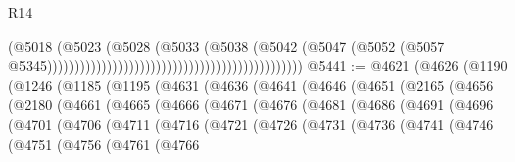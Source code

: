 \begin{lexlean}{R14}
\begin{coremodule}
                                                                                (@5018
                                                                                  (@5023
                                                                                    (@5028
                                                                                      (@5033
                                                                                        (@5038
                                                                                          (@5042
                                                                                            (@5047
                                                                                              (@5052
                                                                                                (@5057
                                                                                                  @5345)))))))))))))))))))))))))))))))))))))))))))))))
@5441 := @4621
    (@4626
      (@1190
        (@1246
          (@1185
            (@1195
              (@4631
                (@4636
                  (@4641
                    (@4646
                      (@4651
                        (@2165
                          (@4656
                            (@2180
                              (@4661
                                (@4665
                                  (@4666
                                    (@4671
                                      (@4676
                                        (@4681
                                          (@4686
                                            (@4691
                                              (@4696
                                                (@4701
                                                  (@4706
                                                    (@4711
                                                      (@4716
                                                        (@4721
                                                          (@4726
                                                            (@4731
                                                              (@4736
                                                                (@4741
                                                                  (@4746
                                                                    (@4751
                                                                      (@4756
                                                                        (@4761
                                                                          (@4766

\end{coremodule}
\end{lexlean}
